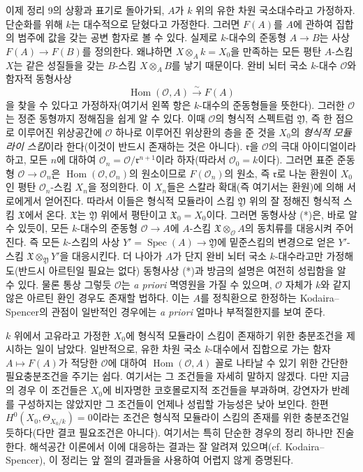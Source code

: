 이제 정리 9의 상황과 표기로 돌아가되, $A$가 $k$ 위의 유한 차원 국소대수라고
가정하자. 단순화를 위해 $k$는 대수적으로 닫혔다고 가정한다. 그러면 $F(A)$를
$A$에 관하여 집합의 범주에 값을 갖는 공변 함자로 볼 수 있다. 실제로
$k$-대수의 준동형 $A\longrightarrow B$는 사상
$F(A)\longrightarrow F(B)$를 정의한다. 왜냐하면
$X\otimes_A k=X_0$을 만족하는 모든 평탄 $A$-스킴 $X$는 같은 성질들을 갖는
$B$-스킴 $X\otimes_A B$를 낳기 때문이다. 완비 뇌터 국소 $k$-대수
$\mathcal O$와 함자적 동형사상
\begin{equation}
  \tag{*}
  \operatorname{Hom}(\mathcal O,A)\xrightarrow{\sim}F(A)
\end{equation}
을 찾을 수 있다고 가정하자(여기서 왼쪽 항은 $k$-대수의 준동형들을 뜻한다).
그러한 $\mathcal O$는 정준 동형까지 정해짐을 쉽게 알 수 있다. 이때
$\mathcal O$의 형식적 스펙트럼 $\mathfrak Y$, 즉 한 점으로 이루어진
위상공간에 $\mathcal O$ 하나로 이루어진 위상환의 층을 준 것을 $X_0$의
\emph{형식적 모듈라이 스킴}이라 한다(이것이 반드시 존재하는 것은 아니다).
$\mathfrak r$을 $\mathcal O$의 극대 아이디얼이라 하고, 모든 $n$에 대하여
$\mathcal O_n=\mathcal O/\mathfrak r^{n+1}$이라 하자(따라서
$\mathcal O_0=k$이다). 그러면 표준 준동형
$\mathcal O\longrightarrow\mathcal O_n$은
$\operatorname{Hom}(\mathcal O,\mathcal O_n)$의 원소이므로
$F(\mathcal O_n)$의 원소, 즉 $\mathfrak r$로 나눈 환원이 $X_0$인 평탄
$\mathcal O_n$-스킴 $X_n$을 정의한다. 이 $X_n$들은 스칼라 확대(즉 여기서는
환원)에 의해 서로에게서 얻어진다. 따라서 이들은 형식적 모듈라이 스킴
$\mathfrak Y$ 위의 잘 정해진 형식적 스킴 $\mathfrak X$에서 온다.
$\mathfrak X$는 $\mathfrak Y$ 위에서 평탄이고 $\mathfrak X_0=X_0$이다.
그러면 동형사상 (*)은, 바로 알 수 있듯이, 모든 $k$-대수의 준동형
$\mathcal O\longrightarrow A$에 $A$-스킴
$\mathfrak X\otimes_{\mathcal O}A$의 동치류를 대응시켜 주어진다. 즉 모든
$k$-스킴의 사상 $Y'=\operatorname{Spec}(A)\longrightarrow\mathfrak Y$에
밑준스킴의 변경으로 얻은 $Y'$-스킴
$\mathfrak X\otimes_{\mathfrak Y}Y'$을 대응시킨다. 더 나아가 $A$가 단지
완비 뇌터 국소 $k$-대수라고만 가정해도(반드시 아르틴일 필요는 없다)
동형사상 (*)과 방금의 설명은 여전히 성립함을 알 수 있다. 물론 통상 그렇듯
$\mathcal O$는 \textit{a priori} 멱영원을 가질 수 있으며,
$\mathcal O$ 자체가 $k$와 같지 않은 아르틴 환인 경우도 존재할 법하다. 이는
$A$를 정칙환으로 한정하는 Kodaira--Spencer의 관점이 일반적인 경우에는
\textit{a priori} 얼마나 부적절한지를 보여 준다.

$k$ 위에서 고유라고 가정한 $X_0$에 형식적 모듈라이 스킴이 존재하기 위한
충분조건을 제시하는 일이 남았다. 일반적으로, 유한 차원 국소 $k$-대수에서
집합으로 가는 함자 $A\longmapsto F(A)$가 적당한 $\mathcal O$에 대하여
$\operatorname{Hom}(\mathcal O,A)$ 꼴로 나타날 수 있기 위한 간단한
필요충분조건을 주기는 쉽다. 여기서는 그 조건들을 자세히 말하지 않겠다.
다만 지금의 경우 이 조건들은 $X_0$에 비자명한 코호몰로지적 조건들을
부과하며, 강연자가 반례를 구성하지는 않았지만 그 조건들이 언제나
성립할 가능성은 낮아 보인다. 한편
$H^0(X_0,\Theta_{X_0/k})=0$이라는 조건은 형식적 모듈라이 스킴의 존재를
위한 충분조건일 듯하다(다만 결코 필요조건은 아니다). 여기서는 특히
단순한 경우의 정리 하나만 진술한다. 해석공간 이론에서 이에 대응하는
결과는 잘 알려져 있으며(cf. Kodaira--Spencer), 이 정리는 앞 절의
결과들을 사용하여 어렵지 않게 증명된다.

